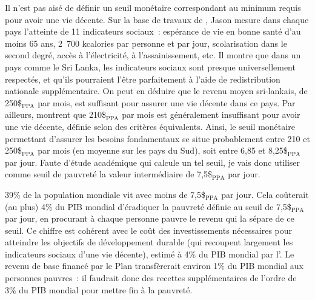 \documentclass[a5paper,french]{memoir}
\begin{document}
Il n'est pas aisé %
de définir un seuil monétaire correspondant au minimum requis pour avoir une vie décente. Sur la base de travaux de \cite{oneill_good_2018}, Jason \cite{hickel_is_2019} mesure dans chaque pays l'atteinte de 11 indicateurs sociaux~: espérance de vie en bonne santé d'au moins 65 ans, 2~700 kcalories par personne et par jour, scolarisation dans le second degré, accès à l'électricité, à l'assainissement, etc. Il montre que dans un pays comme le Sri Lanka, les indicateurs sociaux sont presque universellement respectés, et qu'ils pourraient l'être parfaitement à l'aide de redistribution nationale supplémentaire. On peut en déduire que le revenu moyen sri-lankais, de 250\$$_\text{PPA}$ par mois, %
est suffisant pour assurer une vie décente dans ce pays. Par ailleurs, \cite{kikstra_decent_2021} montrent que 210\$$_\text{PPA}$ par mois %
est généralement insuffisant pour avoir une vie décente, définie selon des critères équivalents. Ainsi, le seuil monétaire permettant d'assurer les besoins fondamentaux se situe probablement entre 210 et 250\$$_\text{PPA}$ par mois (en moyenne sur les pays du Sud), soit entre 6,85 et 8,25\$$_\text{PPA}$ par jour. Faute d'étude académique qui calcule un tel seuil, je vais donc utiliser comme seuil de pauvreté la valeur intermédiaire de 7,5\$$_\text{PPA}$ par jour. 

39\% de la population mondiale vit avec moins de 7,5\$$_\text{PPA}$ par jour. Cela coûterait (au plus) 4\% du PIB mondial d'éradiquer la pauvreté définie au seuil de 7,5\$$_\text{PPA}$ par jour, en procurant à chaque personne pauvre le revenu qui la sépare de ce seuil. Ce chiffre est cohérent avec le coût des investissements nécessaires pour atteindre les objectifs de développement durable (qui recoupent largement les indicateurs sociaux d'une vie décente), estimé à 4\% du PIB mondial par l'\cite{unctad_world_2023}. 
Le revenu de base financé par le Plan transfèrerait environ 1\% du PIB mondial aux personnes pauvres~: %
il faudrait donc des recettes supplémentaires de l'ordre de 3\% du PIB mondial pour mettre fin à la pauvreté. %
\end{document}
